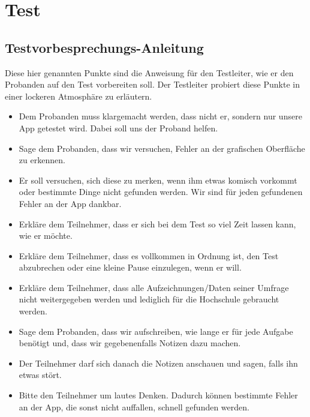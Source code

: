 \chapter{Test}
\label{chap:test}

\section{Testvorbesprechungs-Anleitung}
\label{sec:testvorbesprechung}

Diese hier genannten Punkte sind die Anweisung für den Testleiter, wie er den Probanden auf den Test vorbereiten soll. Der Testleiter probiert diese Punkte in einer lockeren Atmosphäre zu erläutern.

\begin{itemize}
\item Dem Probanden muss klargemacht werden, dass nicht er, sondern nur unsere App getestet wird. Dabei soll uns der Proband helfen.

\item Sage dem Probanden, dass wir versuchen, Fehler an der grafischen Oberfläche zu erkennen.

\item Er soll versuchen, sich diese zu merken, wenn ihm etwas komisch vorkommt oder bestimmte Dinge nicht gefunden werden. Wir sind für jeden gefundenen Fehler an der App dankbar.

\item Erkläre dem Teilnehmer, dass er sich bei dem Test so viel Zeit lassen kann, wie er möchte.

\item Erkläre dem Teilnehmer, dass es vollkommen in Ordnung ist, den Test abzubrechen oder eine kleine Pause einzulegen, wenn er will.

\item Erkläre dem Teilnehmer, dass alle Aufzeichnungen/Daten seiner Umfrage nicht weitergegeben werden und lediglich für die Hochschule gebraucht werden.

\item Sage dem Probanden, dass wir aufschreiben, wie lange er für jede Aufgabe benötigt und, dass wir gegebenenfalls Notizen dazu machen.

\item Der Teilnehmer darf sich danach die Notizen anschauen und sagen, falls ihn etwas stört. 

\item Bitte den Teilnehmer um lautes Denken. Dadurch können bestimmte Fehler an der App, die sonst nicht auffallen, schnell gefunden werden.


\end{itemize}
